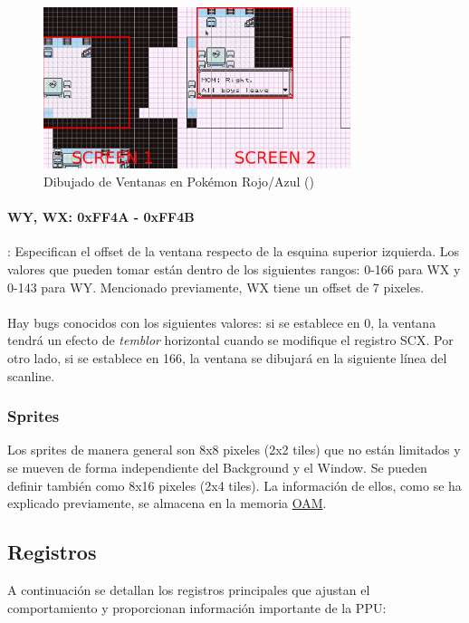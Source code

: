 \begin{figure}[H]
    \centering
    \includegraphics[width=0.8\textwidth]{include/images/window_pokemon.png}
    \caption{Dibujado de Ventanas en Pokémon Rojo/Azul (\cite{goldensacra})}
    \label{figure:window_pokemon}
\end{figure}

\paragraph{WY, WX: 0xFF4A - 0xFF4B}: Especifican el offset de la ventana respecto de la esquina superior izquierda. Los valores que pueden tomar están dentro de los siguientes rangos: 0-166 para WX y 0-143 para WY. Mencionado previamente, WX tiene un offset de 7 pixeles. 
\\\\
Hay bugs conocidos con los siguientes valores: si se establece en 0, la ventana tendrá un efecto de \textit{temblor} horizontal cuando se modifique el registro SCX. Por otro lado, si se establece en 166, la ventana se dibujará en la siguiente línea del scanline.

\subsubsection{Sprites}

Los sprites de manera general son 8x8 pixeles (2x2 tiles) que no están limitados y se mueven de forma independiente del Background y el Window. Se pueden definir también como 8x16 pixeles (2x4 tiles). La información de ellos, como se ha explicado previamente, se almacena en la memoria \hyperref[mem:oam]{OAM}.

\subsection{Registros}

A continuación se detallan los registros principales que ajustan el comportamiento y proporcionan información importante de la PPU:
